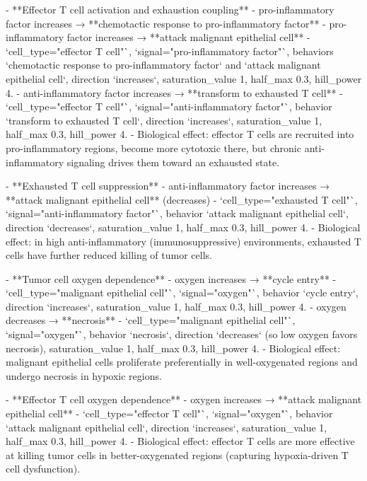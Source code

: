 \documentclass[11pt,a4paper]{article}
\begin{document}
\begin{copilotbox}
- **Effector T cell activation and exhaustion coupling**
  - pro-inflammatory factor increases → **chemotactic response to pro-inflammatory factor**
  - pro-inflammatory factor increases → **attack malignant epithelial cell**
    - `cell\_type="effector T cell"`, `signal="pro-inflammatory factor"`, behaviors `chemotactic response to pro-inflammatory factor` and `attack malignant epithelial cell`, direction `increases`, saturation\_value 1, half\_max 0.3, hill\_power 4.
  - anti-inflammatory factor increases → **transform to exhausted T cell**
    - `cell\_type="effector T cell"`, `signal="anti-inflammatory factor"`, behavior `transform to exhausted T cell`, direction `increases`, saturation\_value 1, half\_max 0.3, hill\_power 4.
  - Biological effect: effector T cells are recruited into pro-inflammatory regions, become more cytotoxic there, but chronic anti-inflammatory signaling drives them toward an exhausted state.

- **Exhausted T cell suppression**
  - anti-inflammatory factor increases → **attack malignant epithelial cell** (decreases)
    - `cell\_type="exhausted T cell"`, `signal="anti-inflammatory factor"`, behavior `attack malignant epithelial cell`, direction `decreases`, saturation\_value 1, half\_max 0.3, hill\_power 4.
  - Biological effect: in high anti-inflammatory (immunosuppressive) environments, exhausted T cells have further reduced killing of tumor cells.

- **Tumor cell oxygen dependence**
  - oxygen increases → **cycle entry**
    - `cell\_type="malignant epithelial cell"`, `signal="oxygen"`, behavior `cycle entry`, direction `increases`, saturation\_value 1, half\_max 0.3, hill\_power 4.
  - oxygen decreases → **necrosis**
    - `cell\_type="malignant epithelial cell"`, `signal="oxygen"`, behavior `necrosis`, direction `decreases` (so low oxygen favors necrosis), saturation\_value 1, half\_max 0.3, hill\_power 4.
  - Biological effect: malignant epithelial cells proliferate preferentially in well-oxygenated regions and undergo necrosis in hypoxic regions.

- **Effector T cell oxygen dependence**
  - oxygen increases → **attack malignant epithelial cell**
    - `cell\_type="effector T cell"`, `signal="oxygen"`, behavior `attack malignant epithelial cell`, direction `increases`, saturation\_value 1, half\_max 0.3, hill\_power 4.
  - Biological effect: effector T cells are more effective at killing tumor cells in better-oxygenated regions (capturing hypoxia-driven T cell dysfunction).


\end{copilotbox}
\end{document}
